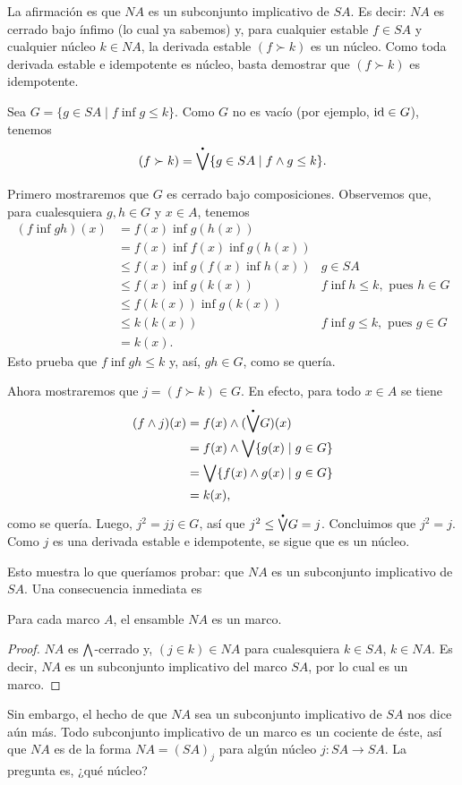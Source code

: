 La afirmación es que $NA$ es un subconjunto implicativo de $SA$.
Es decir: $NA$ es cerrado bajo ínfimo (lo cual ya sabemos) y,
para cualquier estable $f\in SA$ y cualquier núcleo $k\in NA$, la
derivada estable $(f\succ k)$ es un núcleo.
Como toda derivada estable e idempotente es núcleo,
basta demostrar que $(f\succ k)$ es idempotente.

Sea $G=\{g\in SA \mid f\inf g\leq k\}$.
Como $G$ no es vacío (por ejemplo, $\mathrm{id}\in G$), tenemos
\[
  (f\succ k) = \pSup\{g\in SA \mid f\inf g\leq k\}
.\]

Primero mostraremos que $G$ es cerrado bajo composiciones.
Observemos que, para cualesquiera $g,h\in G$ y $x\in A$, tenemos
\begin{align*}
  (f\inf gh)(x)
  &= f(x)\inf g(h(x)) \\
  &= f(x)\inf f(x) \inf g(h(x)) \\
  &\leq f(x) \inf g(f(x)\inf h(x))
    & g\in SA \\
  &\leq f(x) \inf g(k(x))
    & f\inf h \leq k, \text{ pues } h\in G \\
  &\leq f(k(x)) \inf g(k(x)) \\
  &\leq k(k(x))
    & f\inf g \leq k, \text{ pues } g\in G \\
  &= k(x).
\end{align*}
Esto prueba que $f\inf gh \leq k$ y, así, $gh\in G$, como se
quería.

Ahora mostraremos que $j=(f\succ k)\in G$.
En efecto, para todo $x\in A$ se tiene
\begin{align*}
  (f\inf j)(x)
  &= f(x) \inf (\pSup G)(x) \\
  &= f(x) \inf \Sup\{g(x) \mid g\in G\} \\
  &= \Sup\{f(x) \inf g(x) \mid g\in G\} \\
  &= k(x),
\end{align*}
como se quería.
Luego, $j^2=jj\in G$, así que $j^2\leq\pSup G = j$.
Concluimos que $j^2=j$.
Como $j$ es una derivada estable e idempotente,
se sigue que es un núcleo.

Esto muestra lo que queríamos probar: que $NA$ es un subconjunto
implicativo de $SA$.
Una consecuencia inmediata es

\begin{theorem}
  Para cada marco $A$, el ensamble $NA$ es un marco.
\end{theorem}
\begin{proof}
    $NA$ es $\bigwedge$-cerrado y, $(j\in k)\in NA$ para cualesquiera
    $k\in SA$, $k\in NA$.
    Es decir, $NA$ es un subconjunto implicativo del marco $SA$,
    por lo cual es un marco.
\end{proof}
Sin embargo, el hecho de que $NA$ sea un subconjunto
implicativo de $SA$ nos dice aún más.
Todo subconjunto implicativo de un marco es un cociente de éste,
así que $NA$ es de la forma $NA=(SA)_j$ para algún núcleo
$j:SA\to SA$.
La pregunta es, ¿qué núcleo?

